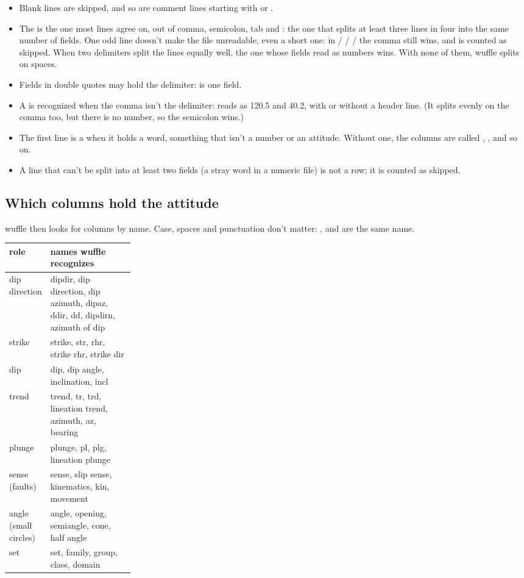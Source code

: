\begin{itemize}
\item Blank lines are skipped, and so are comment lines starting with \code{\#} or \code{//}.
\item The  is the one most lines agree on, out of comma, semicolon, tab and
\code{|}: the one that splits at least three lines in four into the same number of fields. One odd line
doesn't make the file unreadable, even a short one: in  /  /  /
 the comma still wins, and  is counted as skipped. When two delimiters split the
lines equally well, the one whose fields read as numbers wins. With none of them, wuffle splits on
spaces.
\item Fields in double quotes may hold the delimiter:  is one field.
\item A  is recognized when the comma isn't the delimiter: 
reads as 120.5 and 40.2, with or without a header line. (It splits evenly on the comma too, but there
 is no number, so the semicolon wins.)
\item The first line is a  when it holds a word, something that isn't a number or an
attitude. Without one, the columns are called , , and so on.
\item A line that can't be split into at least two fields (a stray word in a numeric file) is not a row;
it is counted as skipped.
\end{itemize}

\subsection{Which columns hold the attitude}\label{sec:data-roles}

wuffle then looks for columns by name. Case, spaces and punctuation don't matter: ,
 and  are the same name.

\begin{center}\small
\begin{tabularx}{\linewidth}{@{}>{\raggedright}p{0.24\linewidth}L@{}}\toprule
\sffamily\bfseries role & \sffamily\bfseries names wuffle recognizes \\\midrule
dip direction & dipdir, dip direction, dip azimuth, dipaz, ddir, dd, dipdirn, azimuth of dip \\
strike & strike, str, rhr, strike rhr, strike dir \\
dip & dip, dip angle, inclination, incl \\
trend & trend, tr, trd, lineation trend, azimuth, az, bearing \\
plunge & plunge, pl, plg, lineation plunge \\
sense (faults) & sense, slip sense, kinematics, kin, movement \\
angle (small circles) & angle, opening, semiangle, cone, half angle \\
set & set, family, group, class, domain \\
\bottomrule\end{tabularx}
\end{center}


